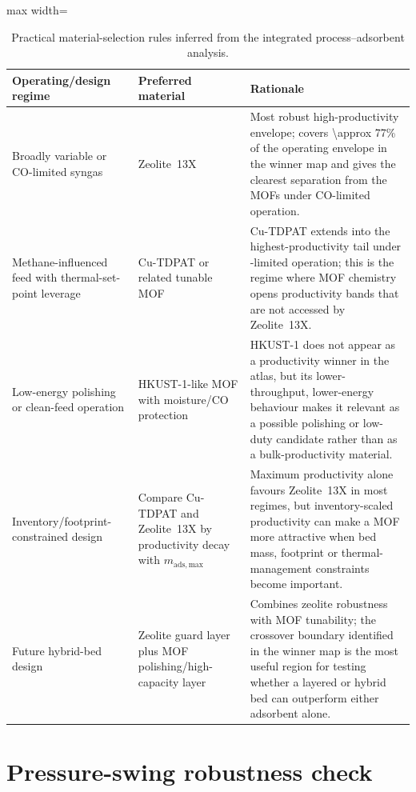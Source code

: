 \documentclass[11pt,a4paper]{article}
\newcommand{\CHfour}{\ce{CH4}}
\begin{document}
\begin{table}[htbp]
\centering
\caption{Practical material-selection rules inferred from the integrated
process--adsorbent analysis.}
\label{tabS:rules}
\small
\begin{adjustbox}{max width=\textwidth}
\begin{tabular}{p{}p{}p{}}
\toprule
Operating/design regime & Preferred material & Rationale \\
\midrule
Broadly variable or CO-limited syngas &
Zeolite~13X &
Most robust high-productivity envelope; covers \num{\approx 77}\% of the
operating envelope in the winner map and gives the clearest separation
from the MOFs under CO-limited operation. \\

Methane-influenced feed with thermal-set-point leverage &
Cu-TDPAT or related tunable MOF &
Cu-TDPAT extends into the highest-productivity tail under \CHfour-limited
operation; this is the regime where MOF chemistry opens productivity
bands that are not accessed by Zeolite~13X. \\

Low-energy polishing or clean-feed operation &
HKUST-1-like MOF with moisture/CO protection &
HKUST-1 does not appear as a productivity winner in the atlas, but its
lower-throughput, lower-energy behaviour makes it relevant as a possible
polishing or low-duty candidate rather than as a bulk-productivity
material. \\

Inventory/footprint-constrained design &
Compare Cu-TDPAT and Zeolite~13X by productivity decay with
$m_{\mathrm{ads,max}}$ &
Maximum productivity alone favours Zeolite~13X in most regimes, but
inventory-scaled productivity can make a MOF more attractive when bed
mass, footprint or thermal-management constraints become important. \\

Future hybrid-bed design &
Zeolite guard layer plus MOF polishing/high-capacity layer &
Combines zeolite robustness with MOF tunability; the crossover boundary
identified in the winner map is the most useful region for testing
whether a layered or hybrid bed can outperform either adsorbent alone. \\
\bottomrule
\end{tabular}
\end{adjustbox}
\end{table}

\FloatBarrier
\section{Pressure-swing robustness check}
\label{secS:vsa}
\end{document}

